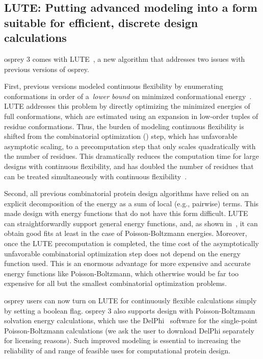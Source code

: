 \subsection{LUTE: Putting advanced modeling into a form suitable for efficient, discrete design calculations}

{\sc osprey} 3 comes with LUTE~\cite{LUTE_RECOMB}, a new algorithm that addresses two issues with previous versions of {\sc osprey}.  

First, previous versions modeled continuous flexibility by enumerating conformations in order of a~\textit{lower bound} on minimized conformational energy~\cite{minDEE,iMinDEE}. LUTE addresses this problem by directly optimizing the minimized energies of full conformations, which are estimated using an expansion in low-order tuples of residue conformations.  Thus, the burden of modeling continuous flexibility is shifted from the combinatorial optimization (\as) step, which has unfavorable asymptotic scaling, to a precomputation step that only scales quadratically with the number of residues. This dramatically reduces the computation time for large designs with continuous flexibility, and has doubled the number of residues that can be treated simultaneously with continuous flexibility~\cite{LUTE_RECOMB}.    

Second, all previous combinatorial protein design algorithms have relied on an explicit decomposition of the energy as a sum of local (e.g., pairwise) terms.  This made design with energy functions that do not have this form difficult. LUTE can straightforwardly support general energy functions, and, as shown in~\cite{LUTE_RECOMB}, it can obtain good fits at least in the case of Poisson-Boltzmann energies.  Moreover, once the LUTE precomputation is completed, the time cost of the asymptotically unfavorable combinatorial optimization step does not depend on the energy function used.  This is an enormous advantage for more expensive and accurate energy functions like Poisson-Boltzmann, which otherwise would be far too expensive for all but the smallest combinatorial optimization problems.  

{\sc osprey} users can now turn on LUTE for continuously flexible calculations simply by setting a boolean flag. 
{\sc osprey} 3 also supports design with Poisson-Boltzmann solvation energy calculations, which use the DelPhi~\cite{OSOR,DelPhi_surface} software for the single-point Poisson-Boltzmann calculations (we ask the user to download DelPhi separately for licensing reasons). Such improved modeling is essential to increasing the reliability of and range of feasible uses for computational protein design.  